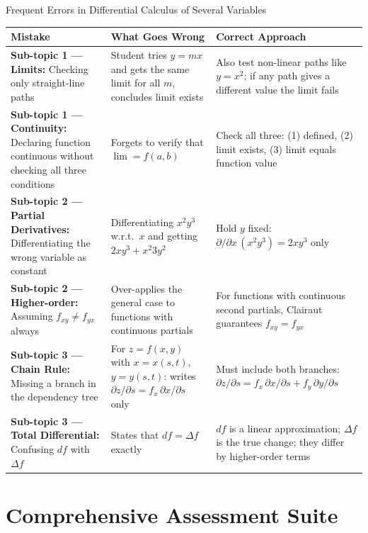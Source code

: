 \documentclass[12pt,a4paper]{article}
\begin{document}
\begin{mistakebox}{Frequent Errors in Differential Calculus of Several Variables}
\begin{tabular}{@{}p{4.5cm}p{5cm}p{5cm}@{}}
\toprule
\textbf{Mistake} & \textbf{What Goes Wrong} & \textbf{Correct Approach} \\
\midrule
\textbf{Sub-topic 1 --- Limits:} Checking only straight-line paths & Student tries \(y=mx\) and gets the same limit for all \(m\), concludes limit exists & Also test non-linear paths like \(y=x^2\); if any path gives a different value the limit fails \\
\textbf{Sub-topic 1 --- Continuity:} Declaring function continuous without checking all three conditions & Forgets to verify that \(\lim = f(a,b)\) & Check all three: (1) defined, (2) limit exists, (3) limit equals function value \\
\textbf{Sub-topic 2 --- Partial Derivatives:} Differentiating the wrong variable as constant & Differentiating \(x^2 y^3\) w.r.t.\ \(x\) and getting \(2xy^3 + x^2 3y^2\) & Hold \(y\) fixed: \(\partial/\partial x\,(x^2 y^3) = 2xy^3\) only \\
\textbf{Sub-topic 2 --- Higher-order:} Assuming \(f_{xy} \neq f_{yx}\) always & Over-applies the general case to functions with continuous partials & For functions with continuous second partials, Clairaut guarantees \(f_{xy} = f_{yx}\) \\
\textbf{Sub-topic 3 --- Chain Rule:} Missing a branch in the dependency tree & For \(z=f(x,y)\) with \(x=x(s,t)\), \(y=y(s,t)\): writes \(\partial z/\partial s = f_x\,\partial x/\partial s\) only & Must include both branches: \(\partial z/\partial s = f_x\,\partial x/\partial s + f_y\,\partial y/\partial s\) \\
\textbf{Sub-topic 3 --- Total Differential:} Confusing \(df\) with \(\Delta f\) & States that \(df = \Delta f\) exactly & \(df\) is a linear approximation; \(\Delta f\) is the true change; they differ by higher-order terms \\
\bottomrule
\end{tabular}
\end{mistakebox}

\section{Comprehensive Assessment Suite}
\end{document}
